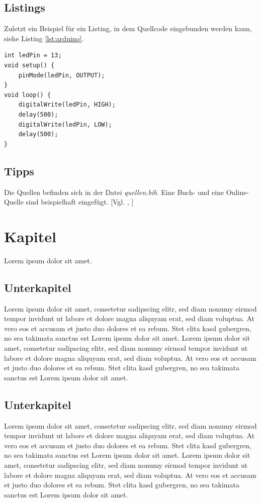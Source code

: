 \documentclass[12pt,a4paper]{article}
\begin{document}
\subsection{Listings}
Zuletzt ein Beispiel für ein Listing, in dem Quellcode eingebunden werden kann, siehe Listing \ref{lst:arduino}.

\vspace{1em}
\begin{lstlisting}[caption=Arduino Beispielprogramm, label=lst:arduino]
int ledPin = 13;
void setup() {
    pinMode(ledPin, OUTPUT);
}
void loop() {
    digitalWrite(ledPin, HIGH);
    delay(500);
    digitalWrite(ledPin, LOW);
    delay(500);
}
\end{lstlisting}

\subsection{Tipps}
Die Quellen befinden sich in der Datei \textit{quellen.bib}. Eine Buch- und eine Online-Quelle sind beispielhaft eingefügt. [Vgl. \cite{buch}, \cite{online}]

\pagebreak

\section{Kapitel}
Lorem ipsum dolor sit amet.

\subsection{Unterkapitel}
Lorem ipsum dolor sit amet, consetetur sadipscing elitr, sed diam nonumy eirmod tempor invidunt ut labore et dolore magna aliquyam erat, sed diam voluptua. At vero eos et accusam et justo duo dolores et ea rebum. Stet clita kasd gubergren, no sea takimata sanctus est Lorem ipsum dolor sit amet. Lorem ipsum dolor sit amet, consetetur sadipscing elitr, sed diam nonumy eirmod tempor invidunt ut labore et dolore magna aliquyam erat, sed diam voluptua. At vero eos et accusam et justo duo dolores et ea rebum. Stet clita kasd gubergren, no sea takimata sanctus est Lorem ipsum dolor sit amet.

\subsection{Unterkapitel}
Lorem ipsum dolor sit amet, consetetur sadipscing elitr, sed diam nonumy eirmod tempor invidunt ut labore et dolore magna aliquyam erat, sed diam voluptua. At vero eos et accusam et justo duo dolores et ea rebum. Stet clita kasd gubergren, no sea takimata sanctus est Lorem ipsum dolor sit amet. Lorem ipsum dolor sit amet, consetetur sadipscing elitr, sed diam nonumy eirmod tempor invidunt ut labore et dolore magna aliquyam erat, sed diam voluptua. At vero eos et accusam et justo duo dolores et ea rebum. Stet clita kasd gubergren, no sea takimata sanctus est Lorem ipsum dolor sit amet.
\pagebreak
\end{document}
